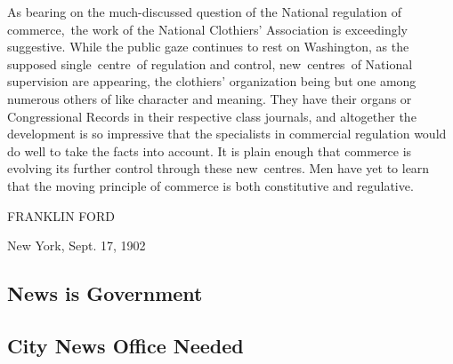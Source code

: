 \documentclass[openany,nobib]{tufte-book}
\let\oldchapter\chapter
\def\chapter{%
  \setcounter{footnote}{0}%
  \oldchapter
}
\begin{document}
As bearing on the much-discussed question of the National regulation of
commerce,~the work of the National Clothiers' Association is exceedingly
suggestive. While the public gaze continues to rest on Washington, as
the supposed single~centre~of regulation and control, new~centres~of
National supervision are appearing, the clothiers' organization being
but one among numerous others of like character and meaning. They have
their organs or Congressional Records in their respective class
journals, and altogether the development is so impressive that the
specialists in commercial regulation would do well to take the facts
into account. It is plain enough that commerce is evolving its further
control through these new~centres. Men have yet to learn that the moving
principle of commerce is both constitutive and regulative.~~

\vspace{0.15}

\hfill{\Large FRANKLIN FORD}

\vspace{0.1}

{\large New York, Sept. 17, 1902}


\begin{fullwidth}

\part{News is Government}

\end{fullwidth}


\chapter[City News Office Needed]{City News Office Needed}
\label{ch:City News Office Needed!}

\vspace{.2in}

\begin{LARGE}


\end{LARGE}
\end{document}
